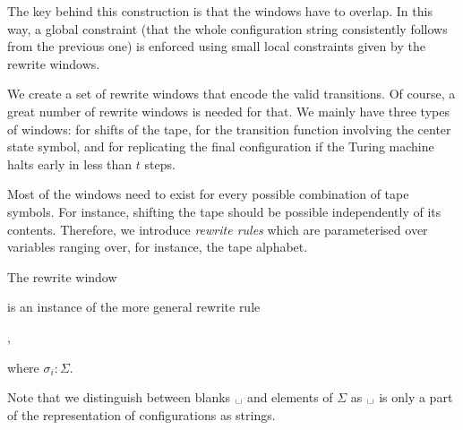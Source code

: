 The key behind this construction is that the windows have to overlap. In this way, a global constraint (that the whole configuration string consistently follows from the previous one) is enforced using small local constraints given by the rewrite windows.

We create a set of rewrite windows that encode the valid transitions. 
Of course, a great number of rewrite windows is needed for that. We mainly have three types of windows: for shifts of the tape, for the transition function involving the center state symbol, and for replicating the final configuration if the Turing machine halts early in less than $t$ steps.

Most of the windows need to exist for every possible combination of tape symbols. For instance, shifting the tape should be possible independently of its contents. Therefore, we introduce \emph{rewrite rules} which are parameterised over variables ranging over, for instance, the tape alphabet.
\begin{example}
  The rewrite window
  \begin{center}
  \end{center}
  is an instance of the more general rewrite rule
  \begin{center}
    ,
  \end{center}
  where $\sigma_i : \Sigma$. 
\end{example}
Note that we distinguish between blanks $\blank$ and elements of $\Sigma$ as $\blank$ is only a part of the representation of configurations as strings.

